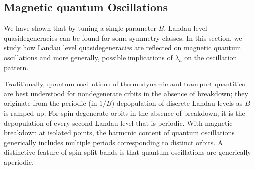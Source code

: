 \documentclass[aps, prb, showpacs, twocolumn, notitlepage, superscriptaddress]{revtex4-1}
\begin{document}

\subsection{Magnetic quantum Oscillations}\label{sec:qo}

We have shown that by tuning a single parameter $B$, Landau level quasidegeneracies can be found for some symmetry classes. In this section, we study how Landau level quasidegeneracies are reflected on magnetic quantum oscillations and more generally, possible implications of $\lambda_a$ on the oscillation pattern.

Traditionally, quantum oscillations of thermodynamic and transport quantities are best understood for nondegenerate orbits in the absence of breakdown; they originate from the periodic (in $1/B$) depopulation of discrete Landau levels as $B$ is ramped up. For spin-degenerate orbits in the absence of breakdown, it is the depopulation of every second Landau level that is periodic. With magnetic breakdown at isolated points, the harmonic content of quantum oscillations generically includes multiple periods corresponding to distinct orbits. A distinctive feature of spin-split bands is that quantum oscillations are generically aperiodic. 

\end{document}
